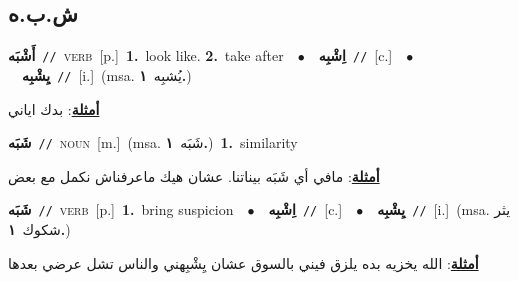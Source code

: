 \documentclass[10pt,a4paper,twoside]{article} %
\begin{document}
\begin{multicols}{2}
\vspace{-3mm}
\subsection*{\color{blue}\foreignlanguage{arabic}{ش.ب.ه}\color{blue}{}} 

{\setlength\topsep{0pt}\textbf{\foreignlanguage{arabic}{أَشْبَه}}\ {\color{gray}\texttt{//}\color{black}}\ \textsc{verb}\ [p.]\ \textbf{1.}~look like.  \textbf{2.}~take after\ \ $\bullet$\ \ \setlength\topsep{0pt}\textbf{\foreignlanguage{arabic}{اِشْبِه}}\ {\color{gray}\texttt{//}\color{black}}\ [c.]\ \ $\bullet$\ \ \setlength\topsep{0pt}\textbf{\foreignlanguage{arabic}{يِشْبِه}}\ {\color{gray}\texttt{//}\color{black}}\ [i.]\ \color{gray}(msa. \foreignlanguage{arabic}{يُشبِه}~\foreignlanguage{arabic}{\textbf{١.}})\color{black}\  \begin{flushright}\color{gray}\foreignlanguage{arabic}{\textbf{\underline{\foreignlanguage{arabic}{أمثلة}}}: بدك اياني}\end{flushright}\color{black}} \vspace{2mm}

{\setlength\topsep{0pt}\textbf{\foreignlanguage{arabic}{شَبَه}}\ {\color{gray}\texttt{//}\color{black}}\ \textsc{noun}\ [m.]\ \color{gray}(msa. \foreignlanguage{arabic}{شَبَه}~\foreignlanguage{arabic}{\textbf{١.}})\color{black}\ \textbf{1.}~similarity\  \begin{flushright}\color{gray}\foreignlanguage{arabic}{\textbf{\underline{\foreignlanguage{arabic}{أمثلة}}}: مافي أي شَبَه بيناتنا. عشان هيك ماعرفناش نكمل مع بعض}\end{flushright}\color{black}} \vspace{2mm}

{\setlength\topsep{0pt}\textbf{\foreignlanguage{arabic}{شَبَه}}\ {\color{gray}\texttt{//}\color{black}}\ \textsc{verb}\ [p.]\ \textbf{1.}~bring suspicion\ \ $\bullet$\ \ \setlength\topsep{0pt}\textbf{\foreignlanguage{arabic}{اِشْبِه}}\ {\color{gray}\texttt{//}\color{black}}\ [c.]\ \ $\bullet$\ \ \setlength\topsep{0pt}\textbf{\foreignlanguage{arabic}{يِشْبِه}}\ {\color{gray}\texttt{//}\color{black}}\ [i.]\ \color{gray}(msa. \foreignlanguage{arabic}{يثر شكوك}~\foreignlanguage{arabic}{\textbf{١.}})\color{black}\  \begin{flushright}\color{gray}\foreignlanguage{arabic}{\textbf{\underline{\foreignlanguage{arabic}{أمثلة}}}: الله يخزيه بده يلزق فيني بالسوق عشان يِشْبِهني والناس تشل عرضي بعدها}\end{flushright}\color{black}} \vspace{2mm}


\end{multicols}
\end{document}
